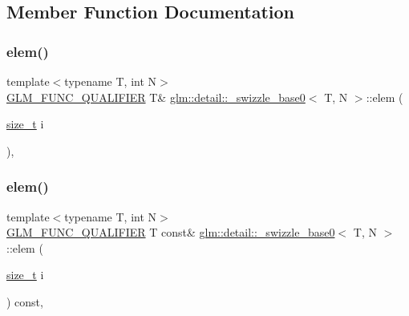 \subsection{Member Function Documentation}
\mbox{\label{structglm_1_1detail_1_1__swizzle__base0_a4011ff1a445ccda72c385462106eb3ff}} 
\subsubsection{\texorpdfstring{elem()}{elem()}\hspace{0.1cm}{\footnotesize\ttfamily [1/2]}}
{\footnotesize\ttfamily template$<$typename T, int N$>$ \\
\hyperlink{setup_8hpp_a33fdea6f91c5f834105f7415e2a64407}{G\+L\+M\+\_\+\+F\+U\+N\+C\+\_\+\+Q\+U\+A\+L\+I\+F\+I\+ER} T\& \hyperlink{structglm_1_1detail_1_1__swizzle__base0}{glm\+::detail\+::\+\_\+swizzle\+\_\+base0}$<$ T, N $>$\+::elem (\begin{DoxyParamCaption}\item[{\hyperlink{_s_d_l__config__winrt_8h_a7c94ea6f8948649f8d181ae55911eeaf}{size\+\_\+t}}]{i }\end{DoxyParamCaption})\hspace{0.3cm}{\ttfamily [inline]}, {\ttfamily [protected]}}

\mbox{\label{structglm_1_1detail_1_1__swizzle__base0_a495081f60b8fc565a5a35bfdd8b13c84}} 
\subsubsection{\texorpdfstring{elem()}{elem()}\hspace{0.1cm}{\footnotesize\ttfamily [2/2]}}
{\footnotesize\ttfamily template$<$typename T, int N$>$ \\
\hyperlink{setup_8hpp_a33fdea6f91c5f834105f7415e2a64407}{G\+L\+M\+\_\+\+F\+U\+N\+C\+\_\+\+Q\+U\+A\+L\+I\+F\+I\+ER} T const\& \hyperlink{structglm_1_1detail_1_1__swizzle__base0}{glm\+::detail\+::\+\_\+swizzle\+\_\+base0}$<$ T, N $>$\+::elem (\begin{DoxyParamCaption}\item[{\hyperlink{_s_d_l__config__winrt_8h_a7c94ea6f8948649f8d181ae55911eeaf}{size\+\_\+t}}]{i }\end{DoxyParamCaption}) const\hspace{0.3cm}{\ttfamily [inline]}, {\ttfamily [protected]}}



